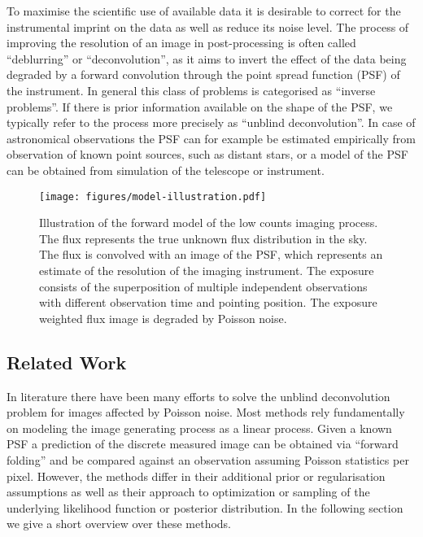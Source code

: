 \documentclass[twocolumn]{aastex631}
\newcommand{\as}[1]{{\color{purple} [AS: #1]}}
\begin{document}
    To maximise the scientific use of available data it is desirable to correct for the instrumental imprint on the data as well as reduce its noise level. The process of improving the resolution of an image in post-processing is often called \enquote{deblurring} or \enquote{deconvolution}, as it aims to invert the effect of the data being degraded by a forward convolution through the point spread function (PSF) of the instrument. In general this class of problems is categorised as \enquote{inverse problems}. If there is prior information available on the shape of the PSF, we typically refer to the process more precisely as \enquote{unblind deconvolution}. In case of astronomical observations the PSF can for example be estimated empirically from observation of known point sources, such as distant stars, or a model of the PSF can be obtained from simulation of the telescope or instrument.

    \begin{figure*}
        \begin{centering}
            \texttt{[image: figures/model-illustration.pdf]}
            \caption{
                Illustration of the forward model of the low counts imaging process. The flux represents the true unknown flux distribution in the sky. The flux is convolved with an image of the PSF, which represents an estimate of the resolution of the imaging instrument. The exposure consists of the superposition of multiple independent observations with different observation time and pointing position. The exposure weighted flux image is degraded by Poisson noise.
            }
            \label{fig:model-illustration}
        \end{centering}
    \end{figure*}
    

    \subsection{Related Work}
    \label{sec:related}
    In literature there have been many efforts to solve the unblind deconvolution problem for images affected by Poisson noise. Most methods rely fundamentally on modeling the image generating process as a linear process. Given a known PSF a prediction of the discrete measured image can be obtained via \enquote{forward folding} and be compared against an observation assuming Poisson statistics per pixel. However, the methods differ in their additional prior or regularisation assumptions as well as their approach to optimization or sampling of the underlying likelihood function or posterior distribution. In the following section we give a short overview over these methods.
    
\end{document}
